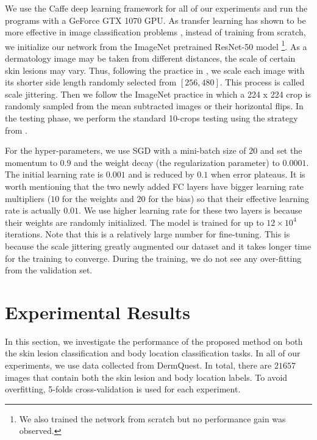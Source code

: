 \documentclass[letterpaper]{article}
\begin{document}
We use the Caffe deep learning framework \cite{DBLP:conf/mm/JiaSDKLGGD14} for
all of our experiments and run the programs with a GeForce GTX 1070 GPU. As transfer
learning has shown to be more effective in image classification problems
\cite{DBLP:conf/cvpr/RazavianASC14}, instead of training from scratch, we
initialize our network from the ImageNet \cite{DBLP:conf/cvpr/DengDSLL009} pretrained
ResNet-50 model \footnote{We also trained the network from scratch but no
performance gain was observed.}. As a dermatology image may be taken from different
distances, the scale of certain skin lesions may vary. Thus, following the practice in \cite{DBLP:journals/corr/SimonyanZ14a}, we scale each image with its shorter side length randomly selected
from $[256, 480]$. This process is called scale jittering. Then we follow the ImageNet
practice in which a 224 x 224 crop is randomly sampled from the mean subtracted
images or their horizontal flips. In the testing phase, we perform the standard
10-crops testing using the strategy from \cite{DBLP:conf/nips/KrizhevskySH12}. 

For the hyper-parameters, we use SGD with a mini-batch size of $20$ and set the
momentum to $0.9$ and the weight decay (the regularization parameter)
to $0.0001$. The initial learning rate is $0.001$ and is reduced by $0.1$ when
error plateaus. It is worth mentioning that the two newly added FC layers have
bigger learning rate multipliers ($10$ for the weights and $20$ for the bias) so
that their effective learning rate is actually $0.01$. We use higher learning rate 
for these two layers is because their weights are randomly initialized. The model
is trained for up to $12 \times 10^4$ iterations. Note that this is a relatively
large number for fine-tuning. This is because the scale jittering greatly augmented our
dataset and it takes longer time for the training to converge. During the training,
we do not see any over-fitting from the validation set.

\section{Experimental Results}

In this section, we investigate the performance of the proposed method on both the
skin lesion classification and body location classification tasks. In all of our
experiments, we use data collected from DermQuest. In total, there are $21657$
images that contain both the skin lesion and body location labels. To avoid
overfitting, 5-folds cross-validation is used for each experiment.
\end{document}
